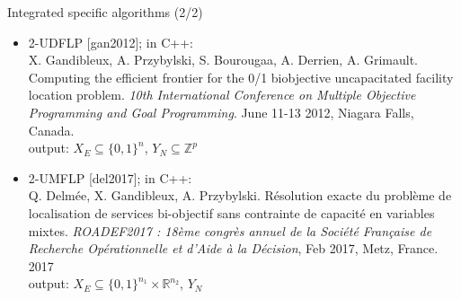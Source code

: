 \documentclass[10pt,xcolor=dvipsnames]{beamer}
\newcommand{\mN}{\mathbb{N}}
\newcommand{\mB}{\{0,1\}}
\newcommand{\grey}{\textcolor{black!25}}
\newcommand{\R}{\mathbb{R}}%
\newcommand{\Z}{\mathbb{Z}}
\begin{document}
%
% 
\begin{frame}{Integrated specific algorithms (2/2)}

{\small
\begin{itemize}
%
%         
%                  
\item \grey{ 2-UDFLP [gan2012]; in C++:\vspace{1mm}\\
         {\tiny X. Gandibleux, A. Przybylski, S. Bourougaa, A. Derrien, A. Grimault.
         Computing the efficient frontier for the 0/1 biobjective uncapacitated facility location problem.
         \textit{10th International Conference on Multiple Objective Programming and Goal Programming}.
         June 11-13 2012, Niagara Falls, Canada.\\}
         output: $X_E \subseteq \mB^n$, $Y_N \subseteq \Z^p$
         }
         \medskip
         
\item \grey{ 2-UMFLP [del2017]; in C++:\vspace{1mm}\\      
         {\tiny Q. Delmée, X. Gandibleux, A. Przybylski. Résolution exacte du problème de localisation de services bi-objectif sans contrainte de capacité en variables mixtes.
         \textit{ROADEF2017 : 18ème congrès annuel de la Société Française de Recherche Opérationnelle et d'Aide à la Décision}, Feb 2017, Metz, France. 2017\\}
         output: $X_E  \subseteq \mB^{n_1} \times \R^{n_2}$, $Y_N$
         }
         \medskip
         

\end{itemize}}
\end{frame}
\end{document}
